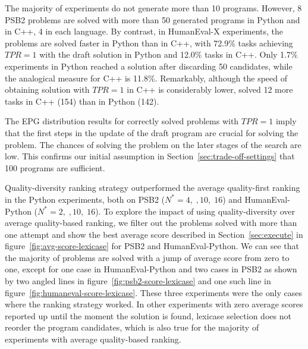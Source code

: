 The majority of experiments do not generate more than 10 programs. 
However, 8 PSB2 problems are solved with more than 50 generated programs in Python and in C++, 4 in each language.
By contrast, in HumanEval-X experiments, the problems are solved faster in Python than in C++, with 72.9\% tasks achieving $TPR=1$ with the draft solution in Python and 12.0\% tasks in C++.
Only 1.7\% experiments in Python reached a solution after discarding 50 candidates, while the analogical measure for C++ is 11.8\%.
Remarkably, although the speed of obtaining solution with $TPR=1$ in C++ is considerably lower, \method{} solved 12 more tasks in C++ (154) than in Python (142). 



The EPG distribution results for correctly solved problems with $TPR=1$ imply that the first steps in the update of the draft program are crucial for solving the problem. 
The chances of solving the problem on the later stages of the search are low.
This confirms our initial assumption in Section~\ref{sec:trade-off-settings} that 100 programs are sufficient.

Quality-diversity ranking strategy outperformed the average quality-first ranking in the Python experiments, both on PSB2 ($N^*=4, \;, 10, \; 16$) and HumanEval-Python ($N^*=2, \;, 10, \; 16$). 
To explore the impact of using quality-diversity over average quality-based ranking, we filter out the problems solved with more than one attempt and show the best average score described in Section~\ref{sec:execute} in figure~\ref{fig:avg-score-lexicase} for PSB2 and HumanEval-Python. 
We can see that the majority of problems are solved with a jump of average score from zero to one, except for one case in HumanEval-Python and two cases in PSB2 as shown by two angled lines in figure~\ref{fig:psb2-score-lexicase} and one such line in figure~\ref{fig:humaneval-score-lexicase}. 
These three experiments were the only cases where the ranking strategy worked. 
In other experiments with zero average scores reported up until the moment the solution is found, lexicase selection does not reorder the program candidates, which is also true for the majority of experiments with average quality-based ranking.


